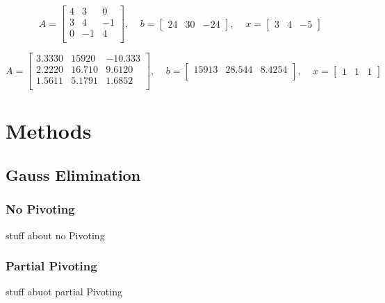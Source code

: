 \documentclass[11pt]{article}	%
\begin{document}
\begin{equation}\label{eq:sample1}
    A = \begin{bmatrix}
            4 & 3 & 0 \\
            3 & 4 & -1 \\
            0 & -1 & 4 \\
        \end{bmatrix}
    ,\;\;\;\;
    b = \begin{bmatrix}
            24 & 30 & -24
        \end{bmatrix}
    ,\;\;\;\;
    x = \begin{bmatrix}
            3 & 4 & -5
        \end{bmatrix}
\end{equation}

\begin{equation}\label{eq:sample1}
    A = \begin{bmatrix}
            3.3330 & 15920 & -10.333\\
            2.2220 & 16.710 & 9.6120\\
            1.5611 & 5.1791 & 1.6852\\
        \end{bmatrix}
    ,\;\;\;\;
    b = \begin{bmatrix}
            15913 & 28.544 & 8.4254\\
        \end{bmatrix}
    ,\;\;\;\;
    x = \begin{bmatrix}
            1 & 1 & 1
        \end{bmatrix}
\end{equation}

\section{Methods}

\subsection{Gauss Elimination}

    \subsubsection{No Pivoting}
    stuff about no Pivoting

    \subsubsection{Partial Pivoting}
    stuff abuot partial Pivoting
\end{document}
